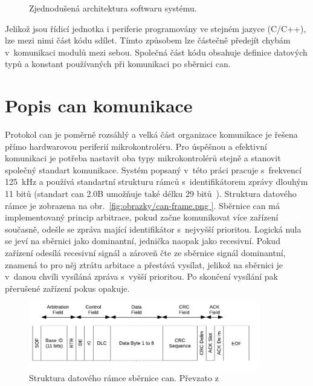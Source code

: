 \begin{figure}[h!]
        
        \caption{Zjednodušená architektura softwaru systému.}
        \label{fig:sw-blokove-schema}
    \end{figure}

    Jelikož jsou řídicí jednotka i periferie programovány ve stejném jazyce (C/C++), lze mezi nimi část kódu sdílet. Tímto způsobem lze částečně předejít chybám v~komunikaci modulů mezi sebou. Společná část kódu obsahuje definice datových typů a konstant používaných při komunikaci po sběrnici \acs{can}.  

\section{Popis \acs{can} komunikace}
    Protokol \acs{can} je poměrně rozsáhlý a velká část organizace komunikace je řešena přímo hardwarovou periferií mikrokontroléru. Pro úspěšnou a efektivní komunikaci je potřeba nastavit oba typy mikrokontrolérů stejně a stanovit společný standart komunikace. Systém popsaný v~této práci pracuje s~frekvencí \qty{125}{kHz} a používá standartní strukturu rámců s~identifikátorem zprávy dlouhým 11 bitů (standart \acs{can} 2.0B umožňuje také délku 29 bitů~\cite{PIC18F26Q83,esp32-tecnical-reference}). Struktura datového rámce je zobrazena na obr.~\ref{fig:obrazky/can-frame.png }. Sběrnice \acs{can} má implementovaný princip arbitrace, pokud začne komunikovat více zařízení současně, odešle se zpráva mající identifikátor s~nejvyšší prioritou. Logická nula se jeví na sběrnici jako dominantní, jednička naopak jako recesivní. Pokud zařízení odesílá recesivní signál a zároveň čte ze sběrnice signál dominantní, znamená to pro něj ztrátu arbitace a přestává vysílat, jelikož na sběrnici je v~danou chvíli vysíláná zpráva s~vyšší prioritou. Po skončení vysílání pak přerušené zařízení pokus opakuje.
    
        \begin{figure}[h!]
            \centering
            \includegraphics[width=0.9\textwidth]{obrazky/can-frame.png}
            \caption{Struktura datového rámce sběrnice \acs{can}. Převzato z~\cite{esp32-datasheet}}
            \label{fig:obrazky/can-frame.png   }
        \end{figure}
        

